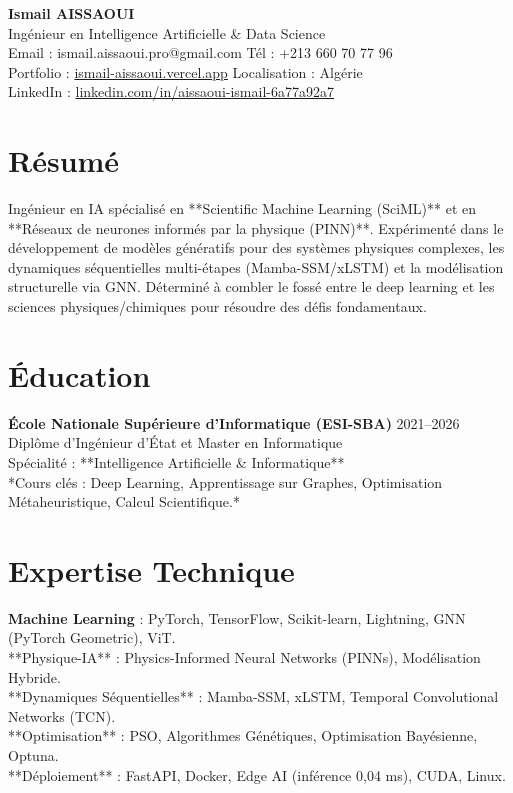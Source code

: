 \documentclass[a4paper,11pt]{article}
\begin{document}
\begin{center}
    {\Huge\bfseries\color{titleblue} Ismail AISSAOUI}\\[4pt]
    {\Large Ingénieur en Intelligence Artificielle \& Data Science}\\[6pt]
    Email : ismail.aissaoui.pro@gmail.com \quad Tél : +213 660 70 77 96 \\
    Portfolio : \href{https://ismail-aissaoui.vercel.app}{ismail-aissaoui.vercel.app} \quad Localisation : Algérie \\
    LinkedIn : \href{https://linkedin.com/in/aissaoui-ismail-6a77a92a7}{linkedin.com/in/aissaoui-ismail-6a77a92a7}
\end{center}

\section{Résumé}
Ingénieur en IA spécialisé en **Scientific Machine Learning (SciML)** et en **Réseaux de neurones informés par la physique (PINN)**. Expérimenté dans le développement de modèles génératifs pour des systèmes physiques complexes, les dynamiques séquentielles multi-étapes (Mamba-SSM/xLSTM) et la modélisation structurelle via GNN. Déterminé à combler le fossé entre le deep learning et les sciences physiques/chimiques pour résoudre des défis fondamentaux.

\section{Éducation}
\textbf{École Nationale Supérieure d'Informatique (ESI-SBA)} \hfill 2021--2026 \\
Diplôme d'Ingénieur d'État et Master en Informatique \\
Spécialité : **Intelligence Artificielle \& Informatique** \\
*Cours clés : Deep Learning, Apprentissage sur Graphes, Optimisation Métaheuristique, Calcul Scientifique.*

\section{Expertise Technique}
\textbf{Machine Learning} : PyTorch, TensorFlow, Scikit-learn, Lightning, GNN (PyTorch Geometric), ViT. \\
**Physique-IA** : Physics-Informed Neural Networks (PINNs), Modélisation Hybride. \\
**Dynamiques Séquentielles** : Mamba-SSM, xLSTM, Temporal Convolutional Networks (TCN). \\
**Optimisation** : PSO, Algorithmes Génétiques, Optimisation Bayésienne, Optuna. \\
**Déploiement** : FastAPI, Docker, Edge AI (inférence 0,04 ms), CUDA, Linux.
\end{document}
